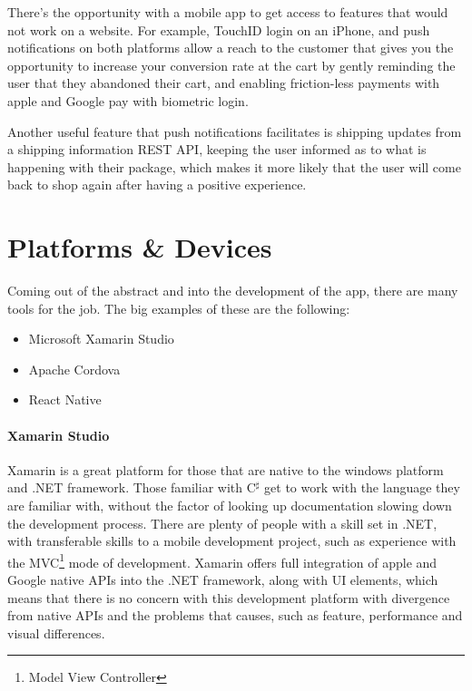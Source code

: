 \documentclass{scrreprt}
\begin{document}
There's the opportunity with a mobile app to get access to features that would not work on a website. For example, TouchID login on an iPhone, and push notifications on both platforms allow a reach to the customer that gives you the opportunity to increase your conversion rate at the cart by gently reminding the user that they abandoned their cart, and enabling friction-less payments with apple and Google pay with biometric login.

Another useful feature that push notifications facilitates is shipping updates from a shipping information REST API, keeping the user informed as to what is happening with their package, which makes it more likely that the user will come back to shop again after having a positive experience.



\section{Platforms \& Devices}

Coming out of the abstract and into the development of the app, there are many tools for the job. The big examples of these are the following:

\begin{itemize}
    \item Microsoft Xamarin Studio
    \item Apache Cordova
    \item React Native
\end{itemize}

\paragraph{Xamarin Studio}

Xamarin is a great platform for those that are native to the windows platform and .NET framework. Those familiar with C$^\sharp$ get to work with the language they are familiar with, without the factor of looking up documentation slowing down the development process. There are plenty of people with a skill set in .NET, with transferable skills to a mobile development project, such as experience with the MVC\footnote{Model View Controller} mode of development. Xamarin offers full integration of apple and Google native APIs into the .NET framework, along with UI elements, which means that there is no concern with this development platform with divergence from native APIs and the problems that causes, such as feature, performance and visual differences.
\end{document}
